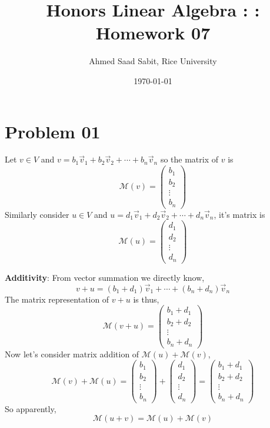 \documentclass[letter]{article}
\title{Honors Linear Algebra : : Homework 07}
\author{Ahmed Saad Sabit, Rice University}
\date{\today}
\begin{document}
\maketitle
\section*{Problem 01} 
Let $v \in  V$ and $v = b_1 \vec{v}_1 + b_2 \vec{v}_2 + \cdots + b_n \vec{v}_n$ so the matrix of $v$ is 
\[
\mathcal M(v) = \begin{pmatrix} b_1 \\ b_2 \\ \vdots \\ b_n\end{pmatrix} 
\] 
Similarly consider $u \in V$ and $u = d_1 \vec{v}_1 + d_2 \vec{v}_2 + \cdots + d_n \vec{v}_n$, it's matrix is
\[
\mathcal M(u) = \begin{pmatrix} d_1 \\ d_2 \\ \vdots \\ d_n  \end{pmatrix} 
\] 

\textbf{Additivity}: From vector summation we directly know, 
\[
v + u = (b_1 + d_1 ) \vec{v}_1 + \cdots + (b_n + d_n) \vec{v}_n 
\]
The matrix representation of $v+u$ is thus, 
\[
\mathcal M (v+u) = 
\begin{pmatrix} b_1+d_1 \\ b_2+d_2 \\ \vdots \\ b_n + d_n  \end{pmatrix} 
\]
Now let's consider matrix addition of $\mathcal M (u) + \mathcal M (v)$, 
\[
\mathcal M(v) + \mathcal M(u)= \begin{pmatrix} b_1 \\ b_2 \\ \vdots \\ b_n\end{pmatrix}  + 
\begin{pmatrix} d_1 \\ d_2 \\ \vdots \\ d_n  \end{pmatrix} 
= \begin{pmatrix} b_1+d_1 \\ b_2+d_2 \\ \vdots \\ b_n + d_n  \end{pmatrix} 
\]
So apparently, 
\[
\mathcal M(u+v) = \mathcal M(u) + \mathcal M(v)
\] 
\end{document}
